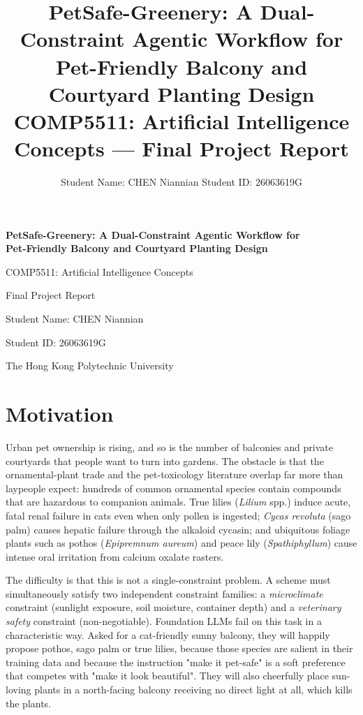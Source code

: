 \documentclass[12pt,a4paper]{article}
\title{\vspace{1.2cm}\textbf{PetSafe-Greenery: A Dual-Constraint Agentic Workflow for\\
Pet-Friendly Balcony and Courtyard Planting Design}\\[0.6cm]
\normalsize COMP5511: Artificial Intelligence Concepts --- Final Project Report}
\author{Student Name: CHEN Niannian \qquad Student ID: 26063619G}
\date{}
\begin{document}
\begin{titlepage}
  \thispagestyle{empty}
  \begin{center}
    \vspace*{1.5cm}
    {\LARGE \bfseries PetSafe-Greenery: A Dual-Constraint Agentic Workflow for\\[0.3cm]
    Pet-Friendly Balcony and Courtyard Planting Design\par}
    \vspace{1.5cm}
    {\large COMP5511: Artificial Intelligence Concepts\par}
    \vspace{0.4cm}
    {\large Final Project Report\par}
    \vfill
    {\large Student Name: CHEN Niannian\par}
    \vspace{0.2cm}
    {\large Student ID: 26063619G\par}
    \vspace{1cm}
    {\large The Hong Kong Polytechnic University\par}
  \end{center}
\end{titlepage}

\section{Motivation}

Urban pet ownership is rising, and so is the number of balconies and private
courtyards that people want to turn into gardens. The obstacle is that the
ornamental-plant trade and the pet-toxicology literature overlap far more than
laypeople expect: hundreds of common ornamental species contain compounds that
are hazardous to companion animals. True lilies (\textit{Lilium} spp.) induce
acute, fatal renal failure in cats even when only pollen is ingested;
\textit{Cycas revoluta} (sago palm) causes hepatic failure through the alkaloid
cycasin; and ubiquitous foliage plants such as pothos
(\textit{Epipremnum aureum}) and peace lily (\textit{Spathiphyllum}) cause
intense oral irritation from calcium oxalate rasters.

The difficulty is that this is not a single-constraint problem. A scheme must
simultaneously satisfy two independent constraint families: a
\emph{microclimate} constraint (sunlight exposure, soil moisture, container
depth) and a \emph{veterinary safety} constraint (non-negotiable). Foundation
LLMs fail on this task in a characteristic way. Asked for a cat-friendly
sunny balcony, they will happily propose pothos, sago palm or true lilies,
because those species are salient in their training data and because the
instruction "make it pet-safe" is a soft preference that competes with
"make it look beautiful". They will also cheerfully place sun-loving plants
in a north-facing balcony receiving no direct light at all, which kills the
plants.
\end{document}
